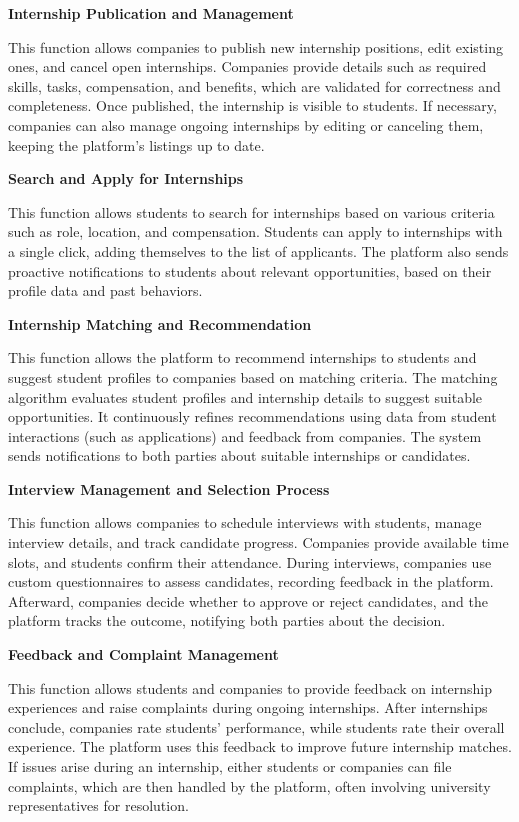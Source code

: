 \textbf{Internship Publication and Management}

This function allows companies to publish new internship positions, edit existing ones, and cancel open internships. Companies provide details such as required skills, tasks, compensation, and benefits, which are validated for correctness and completeness. Once published, the internship is visible to students. If necessary, companies can also manage ongoing internships by editing or canceling them, keeping the platform’s listings up to date.

\textbf{Search and Apply for Internships}

This function allows students to search for internships based on various criteria such as role, location, and compensation. Students can apply to internships with a single click, adding themselves to the list of applicants. The platform also sends proactive notifications to students about relevant opportunities, based on their profile data and past behaviors.

\textbf{Internship Matching and Recommendation}

This function allows the platform to recommend internships to students and suggest student profiles to companies based on matching criteria. The matching algorithm evaluates student profiles and internship details to suggest suitable opportunities. It continuously refines recommendations using data from student interactions (such as applications) and feedback from companies. The system sends notifications to both parties about suitable internships or candidates.

\textbf{Interview Management and Selection Process}

This function allows companies to schedule interviews with students, manage interview details, and track candidate progress. Companies provide available time slots, and students confirm their attendance. During interviews, companies use custom questionnaires to assess candidates, recording feedback in the platform. Afterward, companies decide whether to approve or reject candidates, and the platform tracks the outcome, notifying both parties about the decision.

\textbf{Feedback and Complaint Management}

This function allows students and companies to provide feedback on internship experiences and raise complaints during ongoing internships. After internships conclude, companies rate students' performance, while students rate their overall experience. The platform uses this feedback to improve future internship matches. If issues arise during an internship, either students or companies can file complaints, which are then handled by the platform, often involving university representatives for resolution.

